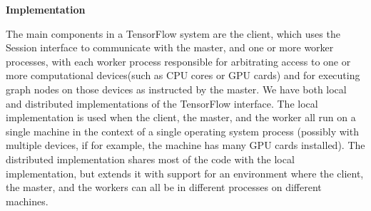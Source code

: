 		\noindent\textbf{Implementation}
		
		\noindent The  main  components  in  a  TensorFlow  system  are  the client, which uses the Session interface to communicate with the master, and one or more
		worker processes, with each worker process responsible for arbitrating access to one or more computational devices(such as CPU cores or GPU cards) and for executing graph nodes on those devices  as  instructed  by  the  master. We  have  both local and distributed implementations of the TensorFlow interface. The  local  implementation  is  used  when  the
		client, the master, and the worker all run on a single machine in the context of a single operating system process (possibly with multiple devices, if for example, the machine  has  many  GPU  cards  installed).   The  distributed implementation shares most of the code with the local
		implementation,  but  extends  it  with  support  for  an  environment where the client, the master, and the workers can all be in different processes on different machines.
		
	
	
	
	
	
	
	
	